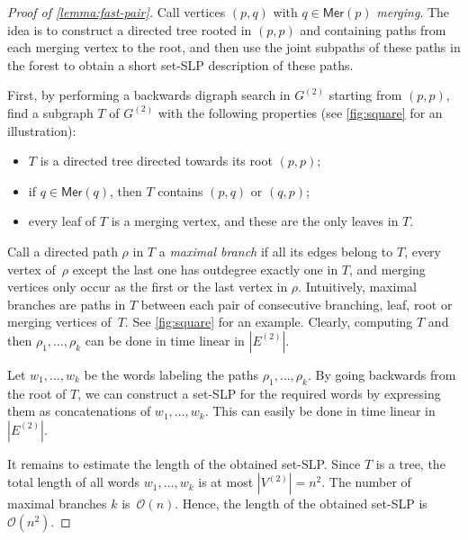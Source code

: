 \documentclass[11pt,a4paper]{amsart}
\newcommand{\OO}{\mathcal{O}}
\newcommand{\Mer}{\mathsf{Mer}}
\theoremstyle{plain}
\theoremstyle{definition}
\theoremstyle{defC}
\theoremstyle{thmC}
\theoremstyle{plain}
\numberwithin{equation}{section}
\begin{document}
\begin{proof}[Proof of \autoref{lemma:fast-pair}]
Call vertices $(p, q)$ with $q \in \Mer(p)$ \emph{merging}. The idea is to construct a directed tree rooted in $(p, p)$ and containing paths from each merging vertex to the root, and then use the joint subpaths of these paths in the forest to obtain a short set-SLP description of these paths.

First, by performing a backwards digraph search in $G^{(2)}$ starting from $(p, p)$, find a subgraph $T$ of $G^{(2)}$ with the following properties (see \autoref{fig:square} for an illustration):
\begin{itemize}
    \item $T$ is a directed tree directed towards its root $(p, p)$;

    \item if $q \in \Mer(q)$, then $T$ contains $(p, q)$ or $(q, p)$;

    \item every leaf of $T$ is a merging vertex, and these are the only leaves in $T$.
\end{itemize}

\noindent
Call a directed path $\rho$ in $T$ a \emph{maximal branch} if all its edges belong to $T$, every vertex of~$\rho$ except the last one has outdegree exactly one in $T$, and merging vertices only occur as the first or the last vertex in $\rho$. Intuitively, maximal branches are paths in $T$ between each pair of consecutive branching, leaf, root or merging vertices of~$T$. See \autoref{fig:square} for an example.
Clearly, computing $T$ and then $\rho_1, \ldots, \rho_k$ can be done in time linear in $|E^{(2)}|$.

Let $w_1, \ldots, w_k$ be the words labeling the paths $\rho_1, \ldots, \rho_k$. 
By going backwards from the root of $T$, we can construct a set-SLP for the required words by expressing them as concatenations of $w_1, \ldots, w_k$. This can easily be done in time linear in $|E^{(2)}|$.

It remains to estimate the length of the obtained set-SLP. Since $T$ is a tree, the total length of all words $w_1, \ldots, w_k$ is at most $|V^{(2)}| = n^2$. The number of maximal branches $k$ is~$\OO(n)$. Hence, the length of the obtained set-SLP is~$\OO(n^2)$.
\end{proof}
\end{document}
